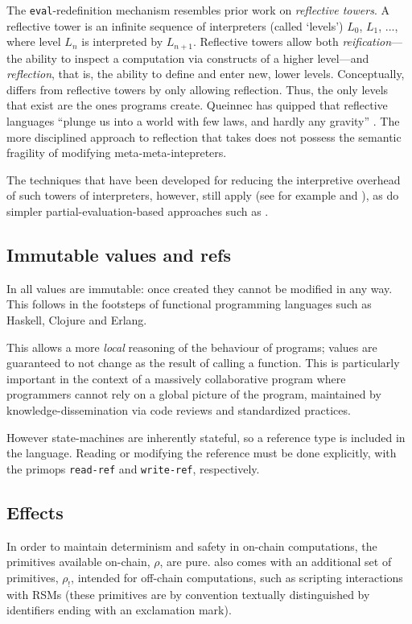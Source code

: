 The \texttt{eval}-redefinition mechanism resembles prior work on
\emph{reflective towers}. A reflective tower is an infinite sequence of
interpreters (called `levels') $L_0$, $L_1$, ..., where level $L_n$ is
interpreted by $L_{n+1}$. Reflective towers allow both \emph{reification}---the
ability to inspect a computation via constructs of a higher level---and
\emph{reflection}, that is, the ability to define and enter new, lower levels.
Conceptually, \rad{} differs from reflective towers by only allowing reflection.
Thus, the only levels that exist are the ones programs create. Queinnec has
quipped that reflective languages ``plunge us into a world with few laws, and
hardly any gravity'' \cite{Queinnec1994}. The more disciplined approach to
reflection that \rad{} takes does not possess the semantic fragility of modifying
meta-meta-intepreters.

The techniques that have been developed for reducing the interpretive overhead
of such towers of interpreters, however, still
apply (see for example \cite{Amin2017} and \cite{Asai2014}), as do simpler
partial-evaluation-based approaches such as \cite{Brown2017}.

\subsection{Immutable values and refs}
In \rad{} all values are immutable: once created they cannot be modified in any
way. This follows in the footsteps of functional programming languages such as
Haskell, Clojure and Erlang.

This allows a more \textit{local} reasoning of the behaviour of programs;
values are guaranteed to not change as the result of calling a function. This
is particularly important in the context of a massively collaborative
program where programmers cannot rely on a global picture of the program,
maintained by knowledge-dissemination via code reviews and standardized
practices.

However state-machines are inherently stateful, so a reference type is included
in the language. Reading or modifying the reference must be done explicitly,
with the primops \texttt{read-ref} and \texttt{write-ref}, respectively.

\subsection{Effects} In order to maintain determinism and safety in on-chain
computations, the primitives available on-chain, $\rho$, are pure. \rad{} also
comes with an additional set of primitives, $\rho_{!}$, intended for off-chain
computations, such as scripting interactions with RSMs (these primitives are
by convention textually distinguished by identifiers ending with an exclamation
mark).

